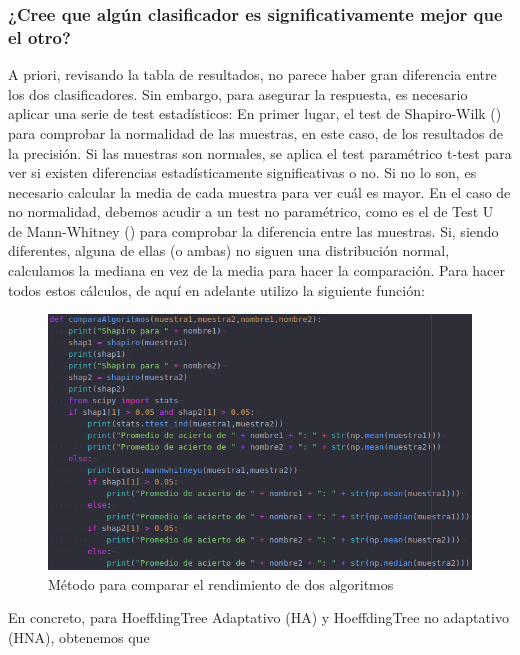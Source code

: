 \subsubsection{¿Cree que algún clasificador es significativamente mejor que el otro?}

A priori, revisando la tabla de resultados, no parece haber gran diferencia entre los dos clasificadores. Sin embargo, para asegurar la respuesta, es necesario aplicar una serie de test estadísticos: En primer lugar, el test de Shapiro-Wilk (\cite{sw}) para comprobar la normalidad de las muestras, en este caso, de los resultados de la precisión. Si las muestras son normales, se aplica el test paramétrico t-test para ver si existen diferencias estadísticamente significativas o no. Si no lo son, es necesario calcular la media de cada muestra para ver cuál es mayor. En el caso de no normalidad, debemos acudir a un test no paramétrico, como es el de Test U de Mann-Whitney (\cite{umw}) para comprobar la diferencia entre las muestras. Si, siendo diferentes, alguna de ellas (o ambas) no siguen una distribución normal, calculamos la mediana en vez de la media para hacer la comparación. Para hacer todos estos cálculos, de aquí en adelante utilizo la siguiente función:

\begin{figure}[H] %
	\centering
	\includegraphics[scale=0.45]{comparaAl.png}  %
	\caption{Método para comparar el rendimiento de dos algoritmos} 
	\label{fig:compAl}
\end{figure}

En concreto, para HoeffdingTree Adaptativo (HA) y HoeffdingTree no adaptativo (HNA), obtenemos que

